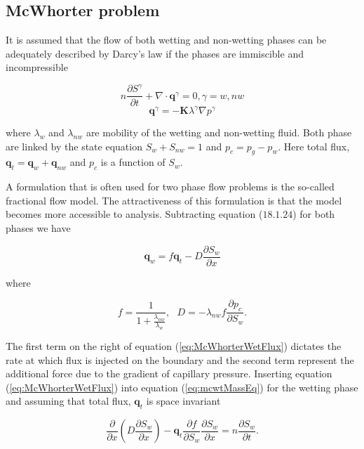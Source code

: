 \subsection{McWhorter problem}

It is assumed that the flow of both wetting and non-wetting phases can be adequately described by Darcy's law if the phases are immiscible and incompressible

\begin{equation}
n\frac{\partial S^{\gamma}}{\partial t} + \nabla \cdot \mathbf{q}^{\gamma} = 0, \gamma=w, nw
\label{eq:mcwtMassEq}
\end{equation}
\begin{equation}
\mathbf{q}^{\gamma}=-{\mathbf K} \lambda^{\gamma} \nabla p^{\gamma}
\label{eq:mcwtFluxEq}
\end{equation}

where $\lambda_w$ and  $\lambda_{nw}$ are mobility of the wetting and non-wetting fluid. Both phase are linked by the state equation $S_w+S_{nw}=1$ and $p_c=p_g-p_w$. Here total flux, $\mathbf {q}_t=\mathbf {q}_w + \mathbf {q}_{nw}$ and $p_c$ is a function of $S_w$.

A formulation that is often used for two phase flow problems is the so-called fractional flow model. The attractiveness of this formulation is that the model becomes more accessible to analysis. Subtracting equation ($18.1.24$) for both phases we have

\begin{equation}
\mathbf {q}_w=f \mathbf {q}_t- D \frac{\partial S_w}{\partial x}
\label{eq:McWhorterWetFlux}
\end{equation}

where 

\begin{equation}
f=\frac{1}{1 + \frac{\lambda_{nw}}{\lambda_w}},~~~D=-\lambda_{nw} f \frac{\partial p_c}{\partial S_w}.
\end{equation}

The first term on the right of equation (\ref{eq:McWhorterWetFlux}) dictates the rate at which flux is injected on the boundary and the second term represent the additional force due to the gradient of capillary pressure. Inserting equation (\ref{eq:McWhorterWetFlux}) into equation (\ref{eq:mcwtMassEq}) for the wetting phase and assuming that total flux, $\mathbf q_t$ is space invariant

\begin{equation}
\frac{\partial }{\partial x}\left( D\frac{\partial S_w}{\partial x}\right) - \mathbf q_t \frac{\partial f}{\partial S_w}\frac{\partial S_w}{\partial x}=n \frac{\partial S_w}{\partial t}.
\label{eq:McWhorterAnal}
\end{equation}

